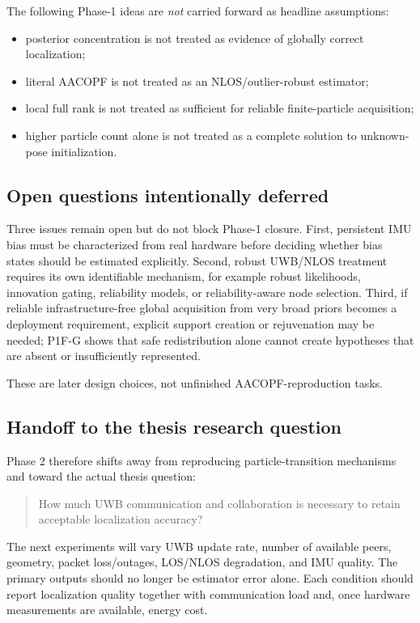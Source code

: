 The following Phase-1 ideas are \emph{not} carried forward as headline assumptions:
\begin{itemize}
    \item posterior concentration is not treated as evidence of globally correct localization;
    \item literal AACOPF is not treated as an NLOS/outlier-robust estimator;
    \item local full rank is not treated as sufficient for reliable finite-particle acquisition;
    \item higher particle count alone is not treated as a complete solution to unknown-pose initialization.
\end{itemize}

\subsection{Open questions intentionally deferred}
Three issues remain open but do not block Phase-1 closure. First, persistent IMU bias must be characterized from real hardware before deciding whether bias states should be estimated explicitly. Second, robust UWB/NLOS treatment requires its own identifiable mechanism, for example robust likelihoods, innovation gating, reliability models, or reliability-aware node selection. Third, if reliable infrastructure-free global acquisition from very broad priors becomes a deployment requirement, explicit support creation or rejuvenation may be needed; P1F-G shows that safe redistribution alone cannot create hypotheses that are absent or insufficiently represented.

These are later design choices, not unfinished AACOPF-reproduction tasks.

\subsection{Handoff to the thesis research question}
Phase 2 therefore shifts away from reproducing particle-transition mechanisms and toward the actual thesis question:
\begin{quote}
How much UWB communication and collaboration is necessary to retain acceptable localization accuracy?
\end{quote}

The next experiments will vary UWB update rate, number of available peers, geometry, packet loss/outages, LOS/NLOS degradation, and IMU quality. The primary outputs should no longer be estimator error alone. Each condition should report localization quality together with communication load and, once hardware measurements are available, energy cost.

